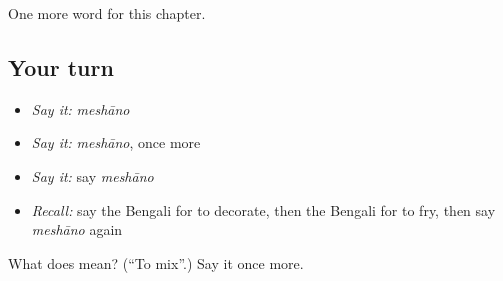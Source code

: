 \begin{grammarlens}[title={What you've built}]
One more word for this chapter.
\end{grammarlens}

\subsection*{Your turn}
\begin{itemize}
\raggedright
  \item \emph{Say it:} \emph{meshāno}
  \item \emph{Say it:} \emph{meshāno}, once more
  \item \emph{Say it:} say \emph{meshāno}
  \item \emph{Recall:} say the Bengali for to decorate, then the Bengali for to fry, then say \emph{meshāno} again
\end{itemize}

\begin{tcolorbox}[breakable,colback=teal!4,colframe=teal!35!black,title={Before you move on}]
What does  mean? (\textquotedblleft{}To mix\textquotedblright{}.) Say it once more.
\end{tcolorbox}
